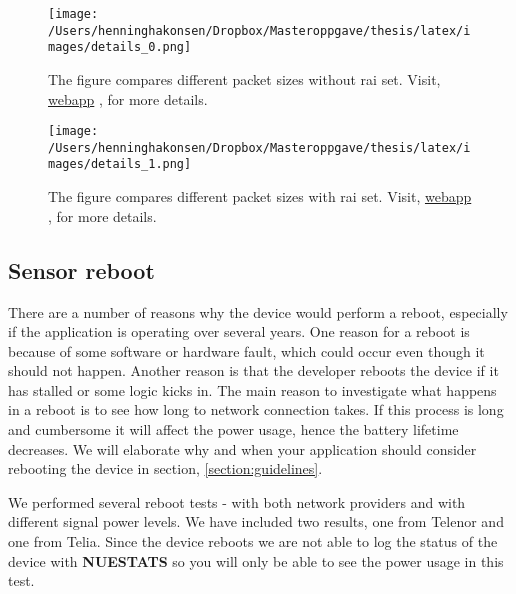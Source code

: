 \documentclass[USenglish]{ifimaster}  %
\begin{document}
\begin{figure}[H]
  \centering
  \texttt{[image: /Users/henninghakonsen/Dropbox/Masteroppgave/thesis/latex/images/details\_0.png]}
  \caption[Short-term test - packet size comparison without \acrshort{rai}]{The figure compares different packet sizes without \acrshort{rai} set. Visit, \href{http://158.39.77.97:9000/\#/results/UiO\_TELIA\_long\_term\_2018-03-22\_0x0\_30\_20}{webapp} \cite{online:result7}, for more details.}
  \label{figure:details_0}
\end{figure}

\begin{figure}[H]
  \centering
  \texttt{[image: /Users/henninghakonsen/Dropbox/Masteroppgave/thesis/latex/images/details\_1.png]}
  \caption[Short-term test - packet size comparison with \acrshort{rai}]{The figure compares different packet sizes with \acrshort{rai} set. Visit, \href{http://158.39.77.97:9000/\#/results/UiO\_TELIA\_long\_term\_2018-03-22\_0x2\_30\_20}{webapp} \cite{online:result8}, for more details.}
  \label{figure:details_1}
\end{figure}

\subsection{Sensor reboot} \label{ssection:reboottest}
There are a number of reasons why the device would perform a reboot, especially if the application is operating over several years. One reason for a reboot is because of some software or hardware fault, which could occur even though it should not happen. Another reason is that the developer reboots the device if it has stalled or some logic kicks in. The main reason to investigate what happens in a reboot is to see how long to network connection takes. If this process is long and cumbersome it will affect the power usage, hence the battery lifetime decreases. We will elaborate why and when your application should consider rebooting the device in section, \vref{section:guidelines}.

We performed several reboot tests - with both network providers and with different signal power levels. We have included two results, one from Telenor and one from Telia. Since the device reboots we are not able to log the status of the device with \textbf{NUESTATS} so you will only be able to see the power usage in this test.
\end{document}
